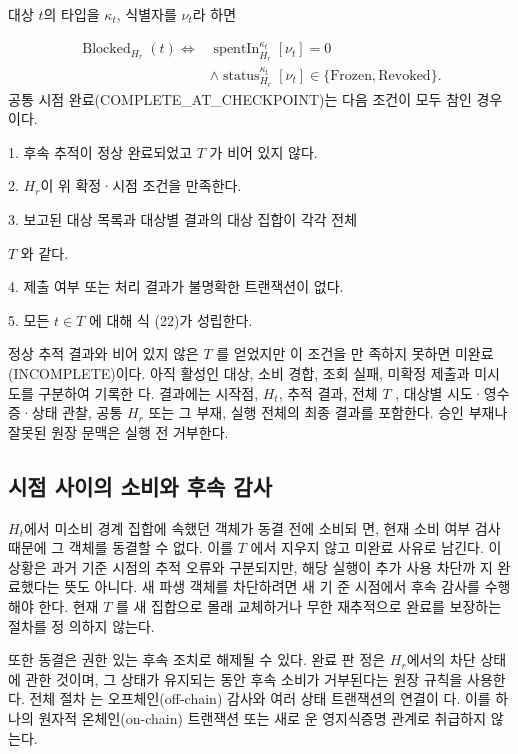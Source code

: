 대상 \(t\)의 타입을 \(κ_{t}\), 식별자를 \(ν_{t}\)라 하면

\begin{equation}
    \begin{aligned}\operatorname{Blocked}_{H_r}(t)\iff{}&\operatorname{spentIn}_{H_r}^{\kappa_t}[\nu_t]=0\\&\land\operatorname{status}_{H_r}^{\kappa_t}[\nu_t]\in\{\mathrm{Frozen},\mathrm{Revoked}\}.\end{aligned}\tag{22}
\end{equation}
공통 시점 완료(COMPLETE\_AT\_CHECKPOINT)는 다음 조건이
모두 참인 경우이다.

1. 후속 추적이 정상 완료되었고 \(T\) 가 비어 있지 않다.

2. \(H_{r}\)이 위 확정·시점 조건을 만족한다.

3. 보고된 대상 목록과 대상별 결과의 대상 집합이 각각 전체

\(T\) 와 같다.

4. 제출 여부 또는 처리 결과가 불명확한 트랜잭션이 없다.

5. 모든 \(t∈T\) 에 대해 식 (22)가 성립한다.

정상 추적 결과와 비어 있지 않은 \(T\) 를 얻었지만 이 조건을 만
족하지 못하면 미완료(INCOMPLETE)이다. 아직 활성인 대상,
소비 경합, 조회 실패, 미확정 제출과 미시도를 구분하여 기록한
다. 결과에는 시작점, \(H_{t}\), 추적 결과, 전체 \(T\) , 대상별 시도·영수
증·상태 관찰, 공통 \(H_{r}\) 또는 그 부재, 실행 전체의 최종 결과를
포함한다. 승인 부재나 잘못된 원장 문맥은 실행 전 거부한다.

\subsection{시점 사이의 소비와 후속 감사}
\(H_{t}\)에서 미소비 경계 집합에 속했던 객체가 동결 전에 소비되
면, 현재 소비 여부 검사 때문에 그 객체를 동결할 수 없다. 이를
\(T\) 에서 지우지 않고 미완료 사유로 남긴다. 이 상황은 과거 기준
시점의 추적 오류와 구분되지만, 해당 실행이 추가 사용 차단까
지 완료했다는 뜻도 아니다. 새 파생 객체를 차단하려면 새 기
준 시점에서 후속 감사를 수행해야 한다. 현재 \(T\) 를 새 집합으로
몰래 교체하거나 무한 재추적으로 완료를 보장하는 절차를 정
의하지 않는다.

또한 동결은 권한 있는 후속 조치로 해제될 수 있다. 완료 판
정은 \(H_{r}\)에서의 차단 상태에 관한 것이며, 그 상태가 유지되는
동안 후속 소비가 거부된다는 원장 규칙을 사용한다. 전체 절차
는 오프체인(off-chain) 감사와 여러 상태 트랜잭션의 연결이
다. 이를 하나의 원자적 온체인(on-chain) 트랜잭션 또는 새로
운 영지식증명 관계로 취급하지 않는다.


